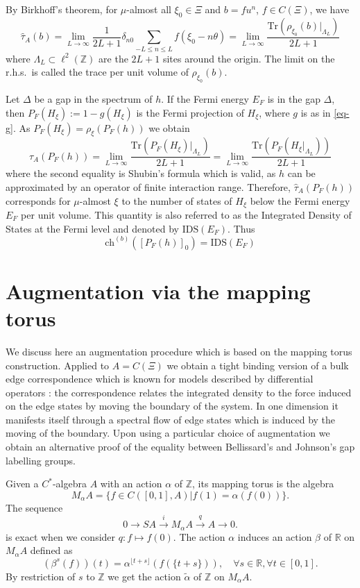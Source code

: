 \documentclass[11pt]{amsart}
\newcommand{\R}{\mathbb{R}}
\newcommand{\Z}{\mathbb{Z}}
\newcommand{\chb}{\text{ch}^{(b)}}
\begin{document}
By Birkhoff's theorem, for $\mu$-almost all $\xi_0\in\Xi$ and $b = f u^n$, $f\in C(\Xi)$, we have 
$$\hat\tau_A(b)=\lim_{L\rightarrow \infty}\frac{1}{2L+1}\delta_{n0} \sum_{-L\le n\le L}f(\xi_0-n\theta) = \lim_{L\rightarrow \infty}\frac{\mathrm{Tr}(\rho_{\xi_0}(b)|_{\Lambda_L})}{2L+1}$$
where $\Lambda_L\subset \ell^2(\Z)$ are the $2L+1$ sites around the origin. The limit on the r.h.s.\ is called the trace per unit volume of $\rho_{\xi_0}(b)$.


Let $\Delta$ be a gap in the spectrum of $h$. If the Fermi energy $E_F$ is in the gap $\Delta$, then 
$P_F(H_\xi):=1-g(H_\xi)$ is the Fermi projection of $H_\xi$, where $g$ is as in \eqref{eq-g}.  
As $P_F(H_\xi) = \rho_\xi(P_F(h))$ we obtain 
$$\hat{\tau}_A(P_F(h))=\lim_{L\rightarrow \infty}\frac{\mathrm{Tr}(P_F(H_\xi)|_{\Lambda_L})}{2L+1}=\lim_{L\rightarrow \infty} \frac{\mathrm{Tr}(P_F(H_\xi|_{\Lambda_L}))}{2L+1}$$
where the second equality is Shubin's formula which is valid, as $h$ can be approximated by an operator of finite interaction range. 
Therefore, $\hat{\tau}_A(P_F(h))$ corresponds for $\mu$-almost $\xi$ to the number of states of $H_\xi$ below the Fermi energy $E_F$ per unit volume. This quantity is also referred to as the Integrated Density of States at the Fermi level and denoted by $\mathrm{IDS}(E_F)$. Thus
\begin{equation}\label{eq-int-chb}
\chb([P_F(h)]_0) = \mathrm{IDS}(E_F)
\end{equation}
\section{Augmentation via the mapping torus}
We discuss here an augmentation procedure which is based on the mapping torus construction. Applied to $A=C(\Xi)$ we obtain a tight binding version of a bulk edge  correspondence which is known for models described by differential operators \cite{ZoisKellendonk2005rotation}: the correspondence relates the integrated density to the force induced on the edge states by moving the boundary of the system. In one dimension it manifests itself through a spectral flow of edge states which is induced by the moving of the boundary. Upon using a particular choice of augmentation we obtain an alternative proof of the equality between Bellissard's and Johnson's gap labelling groups.

Given a $C^*$-algebra $A$ with an action $\alpha$ of $\Z$, its mapping torus is the algebra
$$M_\alpha A=\{f\in C([0,1], A)|f(1)=\alpha(f(0)) \}.$$
The sequence
\begin{equation*}
	0 \rightarrow SA \xrightarrow{i}  M_\alpha A \xrightarrow{q} A \rightarrow 0.
\end{equation*}
is exact when we consider $q: f\mapsto f(0)$. The action $\alpha$ induces an action $\beta$ of $\R$ on $M_\alpha A$ defined as
$$(\beta^s(f))(t)=\alpha^{\lfloor t+s\rfloor}(f(\{t+s\})), \quad \forall s\in\R, \forall t\in [0,1].$$
By restriction of $s$ to $\Z$ we get the action $\tilde{\alpha}$ of $\Z$ on $M_\alpha A$. 
\end{document}
